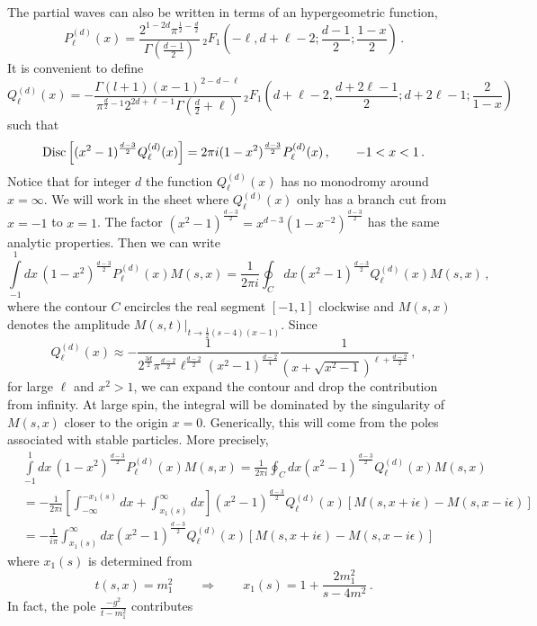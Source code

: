 \documentclass[12pt]{article}
\newcommand{\begBvR}[1]{\begin{#1}}
\newcommand{\beq}{\begBvR{equation}}
\newcommand{\eeq}{\end{equation}}
\newcommand{\<}{{\langle}}
\renewcommand{\>}{{\rangle}}
\begin{document}
The partial waves can also be written in terms of an hypergeometric function,
\beq
P^{(d)}_\ell(x)= 
\frac{2^{1-2 d} \pi ^{\frac{1}{2}-\frac{d}{2}} }{\Gamma \left(\frac{d-1}{2}\right)}\,
   _2F_1\left(-\ell,d+\ell-2;\frac{d-1}{2};\frac{1-x}{2}\right)\,.
\eeq
It is convenient to define
\beq
Q^{(d)}_\ell(x)= -
\frac{ \Gamma (l+1)
   (x-1)^{2-d-\ell} }{
   \pi ^{\frac{d}{2}-1} 2^{2 d+\ell-1}\Gamma
   \left(\frac{d}{2}+\ell\right)}
   \, _2F_1\left(d+\ell-2,
   \frac{d+2\ell-1}{2} ;d+2 \ell-1;\frac{2}{1-x}\right)
\eeq
such that
\beq
{\rm Disc} \left[(x^2-1)^{\frac{d-3}{2}}Q^{(d)}_\ell(x) \right]=
2\pi i (1-x^2)^{\frac{d-3}{2}}P^{(d)}_\ell(x)\,, \qquad -1<x<1\,.
\eeq
Notice that for integer $d$ the function $Q^{(d)}_\ell(x)$ has no monodromy around $x=\infty$. We will work in the sheet where $Q^{(d)}_\ell(x)$ only has a branch cut from $x=-1$ to $x=1$.
The factor $(x^2-1)^{\frac{d-3}{2}}=x^{d-3} (1-x^{-2})^{\frac{d-3}{2}} $ has the same analytic properties.
Then we can write 
\beq 
  \int\limits_{-1}^1\! dx\, (1-x^2)^{\frac{d-3}{2}}P^{(d)}_\ell(x)  M(s, x) = \frac{1}{2\pi i} \oint_C dx (x^2-1)^{\frac{d-3}{2}}Q^{(d)}_\ell(x)
  M(s,x)\,,
\eeq
where the contour $C$ encircles the real segment $[-1,1]$ clockwise and $M(s,x)$ denotes the amplitude $\left. M(s, t)\right|_{t\to \tfrac{1}{2}(s-4) (x-1)}$.
Since
\beq
Q^{(d)}_\ell(x)\approx -\frac{1}{
2^{\frac{3d}{2}  } \pi
   ^{\frac{d-2}{2} }
   \ell^{\frac{d-2}{2}}
   \left(x^2-1\right)^{\frac{d-2}{4}}} 
   \frac{1}{(x+\sqrt{x^2-1})^{\ell+\frac{d-2}{2}}}\,,
\eeq
for large $\ell$ and $x^2 >1$, we can expand the contour
and drop the contribution from infinity. At large spin, the integral will be dominated by the singularity of $M(s,x)$ closer to the origin $x=0$.
Generically, this will come from the poles associated with stable particles. More precisely,
\begin{align}
&\int\limits_{-1}^1\! dx\, (1-x^2)^{\frac{d-3}{2}}P^{(d)}_\ell(x)  M(s, x) = \frac{1}{2\pi i} \oint_C dx (x^2-1)^{\frac{d-3}{2}}Q^{(d)}_\ell(x)
  M(s,x) \\
&= -\frac{1}{2\pi i  }\left[
 \int_{-\infty}^{-x_1(s)}  dx + \int_{x_1(s)}^\infty dx \right]
 (x^2-1)^{\frac{d-3}{2}}Q^{(d)}_\ell(x) \left[M(s,x+i\epsilon)-M(s,x-i\epsilon)\right]\\
  &= -\frac{1}{i\pi  }  \int_{x_1(s)}^\infty dx 
 (x^2-1)^{\frac{d-3}{2}}Q^{(d)}_\ell(x) \left[M(s,x+i\epsilon)-M(s,x-i\epsilon)\right]
\end{align}
where $x_1(s)$ is determined from
\beq
t(s,x)=m_1^2\qquad \Rightarrow \qquad
x_1(s)=1+\frac{2m_1^2}{s-4m^2}\,.
\eeq
In fact, the pole $\frac{-g^2}{t-m_1^2}$ contributes
\end{document}
